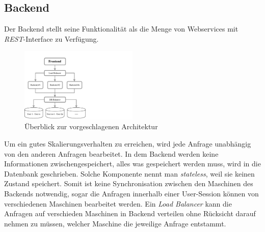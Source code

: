 
\subsection{Backend}

Der Backend stellt seine Funktionalität als die Menge von Webservices mit \textit{REST}-Interface zu Verfügung.

\begin{figure}[H]
\centering
\includegraphics[trim = 0mm 0mm 0mm 0mm, clip, width=0.5\textwidth]{resources/ueberblickArchitektur}
\caption[Überblick zur vorgeschlagenen Architektur]{Überblick zur vorgeschlagenen Architektur}
\label{img:ueberblickArchitektur}
\end{figure}

Um ein gutes Skalierungsverhalten zu erreichen, wird jede Anfrage unabhängig von den anderen Anfragen bearbeitet. In dem Backend werden keine Informationen zwischengespeichert, alles was gespeichert werden muss, wird in die Datenbank geschrieben. Solche Komponente nennt man \textit{stateless}, weil sie keinen Zustand speichert. Somit ist keine Synchronisation zwischen den Maschinen des Backends notwendig, sogar die Anfragen innerhalb einer User-Session können von verschiedenen Maschinen bearbeitet werden. Ein \textit{Load Balancer} kann die Anfragen auf verschieden Maschinen in Backend verteilen ohne Rücksicht darauf nehmen zu müssen, welcher Maschine die jeweilige Anfrage entstammt.

